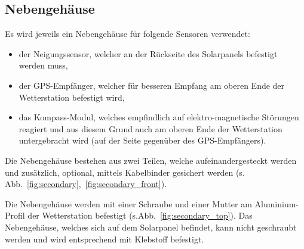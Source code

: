 \subsection{Nebengehäuse}\label{sec:ge_neben}
Es wird jeweils ein Nebengehäuse für folgende Sensoren verwendet:
\begin{itemize}
\item der Neigungssensor, welcher an der Rückseite des Solarpanels befestigt werden muss,
\item der GPS-Empfänger, welcher für besseren Empfang am oberen Ende der Wetterstation befestigt wird,
\item das Kompass-Modul, welches empfindlich auf elektro-magnetische Störungen reagiert und aus diesem Grund auch am oberen Ende der Wetterstation untergebracht wird (auf der Seite gegenüber des GPS-Empfängers).
\end{itemize}
Die Nebengehäuse bestehen aus zwei Teilen, welche aufeinandergesteckt werden und zusätzlich, optional, mittels Kabelbinder gesichert werden (s. Abb.~\ref{fig:secondary},~\ref{fig:secondary_front}).

Die Nebengehäuse werden mit einer Schraube und einer Mutter am Aluminium-Profil der Wetterstation befestigt (s.Abb.~\ref{fig:secondary_top}). Das Nebengehäuse, welches sich auf dem Solarpanel befindet, kann nicht geschraubt werden und wird entsprechend mit Klebstoff befestigt.

